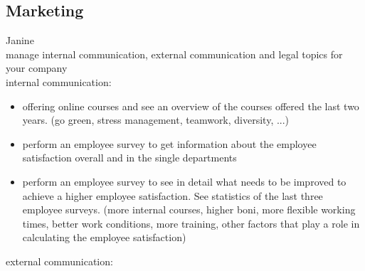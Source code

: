 \documentclass[11pt,titlepage,oneside,openany]{book}
\begin{document}
\subsection{Marketing} \label{marketing_manual}
Janine\\
manage internal communication, external communication and legal topics for your company 
\\
internal communication: 
\begin{itemize} 
\item offering online courses and see an overview of the courses offered the last two years. (go green, stress management, teamwork, diversity, ...) 
\item perform an employee survey to get information about the employee satisfaction overall and in the single departments
\item perform an employee survey to see in detail what needs to be improved to achieve a higher employee satisfaction. See statistics of the last three employee surveys. (more internal courses, higher boni, more flexible working times, better work conditions, more training, other factors that play a role in calculating the employee satisfaction)   
\end{itemize}
external communication: 
\end{document}
